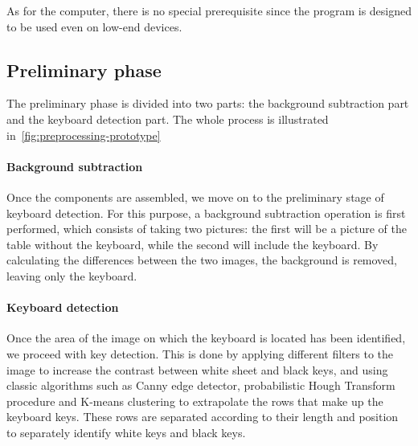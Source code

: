 As for the computer, there is no special prerequisite since the program is designed to
be used even on low-end devices.

\subsection{Preliminary phase}\label{subsec:preliminary-phase-prototype}
The preliminary phase is divided into two parts: the background subtraction part and the keyboard detection part.
The whole process is illustrated in~\autoref{fig:preprocessing-prototype}

\paragraph{Background subtraction}
Once the components are assembled, we move on to the preliminary stage of keyboard detection.
For this purpose, a background subtraction operation is first performed, which consists of taking two pictures:
the first will be a picture of the table without the keyboard, while the second will include the keyboard.
By calculating the differences between the two images, the background is removed, leaving only the keyboard.

\paragraph{Keyboard detection}
Once the area of the image on which the keyboard is located has been identified, we proceed with key detection.
This is done by applying different filters to the image to increase the contrast between white sheet and black keys,
and using classic algorithms such as Canny edge detector, probabilistic Hough Transform procedure
and K-means clustering to extrapolate the rows that make up the keyboard keys.
These rows are separated according to their length and position to separately identify white keys and black keys.

